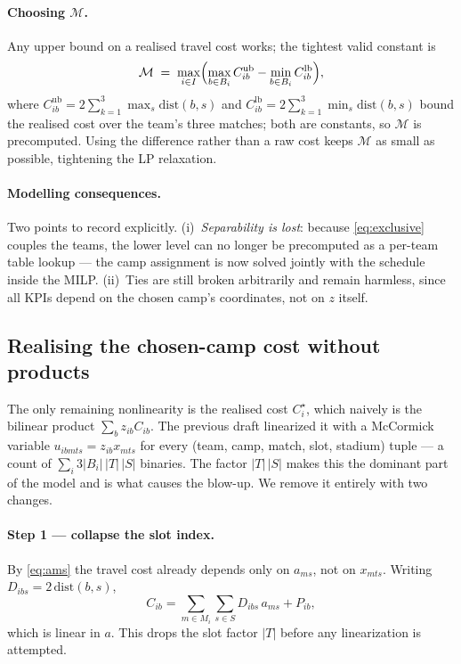 \documentclass[12pt, letterpaper]{article}
\begin{document}
\paragraph{Choosing $\mathcal{M}$.} Any upper bound on a realised travel
cost works; the tightest valid constant is
\begin{equation}
\mathcal{M} \;=\; \max_{i\in I}\Bigl(\max_{b\in B_i}C^{\mathrm{ub}}_{ib}
  - \min_{b\in B_i}C^{\mathrm{lb}}_{ib}\Bigr),
\end{equation}
where $C^{\mathrm{ub}}_{ib}=2\sum_{k=1}^{3}\max_{s}\mathrm{dist}(b,s)$ and
$C^{\mathrm{lb}}_{ib}=2\sum_{k=1}^{3}\min_{s}\mathrm{dist}(b,s)$ bound the
realised cost over the team's three matches; both are constants, so
$\mathcal{M}$ is precomputed. Using the difference rather than a raw cost
keeps $\mathcal{M}$ as small as possible, tightening the LP relaxation.

\paragraph{Modelling consequences.} Two points to record explicitly.
(i)~\emph{Separability is lost}: because \eqref{eq:exclusive} couples the
teams, the lower level can no longer be precomputed as a per-team table
lookup --- the camp assignment is now solved jointly with the schedule
inside the MILP. (ii)~Ties are still broken arbitrarily and remain
harmless, since all KPIs depend on the chosen camp's coordinates, not on
$z$ itself.

\subsection{Realising the chosen-camp cost without products}
\label{sec:bilinear}

The only remaining nonlinearity is the realised cost $C_i^\star$, which
naively is the bilinear product $\sum_b z_{ib}C_{ib}$. The previous draft
linearized it with a McCormick variable $u_{ibmts}=z_{ib}x_{mts}$ for
every (team, camp, match, slot, stadium) tuple --- a count of
$\sum_i 3|B_i|\,|T|\,|S|$ binaries. The factor $|T|\,|S|$ makes this the
dominant part of the model and is what causes the blow-up. We remove it
entirely with two changes.

\paragraph{Step 1 --- collapse the slot index.} By \eqref{eq:ams} the
travel cost already depends only on $a_{ms}$, not on $x_{mts}$. Writing
$D_{ibs}=2\,\mathrm{dist}(b,s)$,
\begin{equation}
C_{ib}=\sum_{m\in M_i}\sum_{s\in S} D_{ibs}\,a_{ms}+P_{ib},
\label{eq:cibA}
\end{equation}
which is linear in $a$. This drops the slot factor $|T|$ before any
linearization is attempted.
\end{document}
